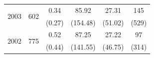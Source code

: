 \documentclass[remotesensing,article,accept,moreauthors,pdftex,10pt,a4paper]{Definitions/mdpi}
\begin{document}
\begin{table}[H]
\begin{center}
{\begin{tabular}{cccccc}
				\multirow{2}{*}{2003} & \multirow{2}{*}{602}      & 0.34  & 85.92  & 27.31 & 145  \\ 
				&&             (0.27)  & (154.48) & (51.02) & (529) \\\midrule
		
				\multirow{2}{*}{2002} & \multirow{2}{*}{775}      & 0.52  & 87.25  & 27.22 & 97  \\ 
				&&             (0.44) & (141.55) & (46.75) & (314) \\
				\bottomrule
			\end{tabular}
		}%
	\end{center}
\end{table}



%				
%				
%				
%				
%				
\end{document}
